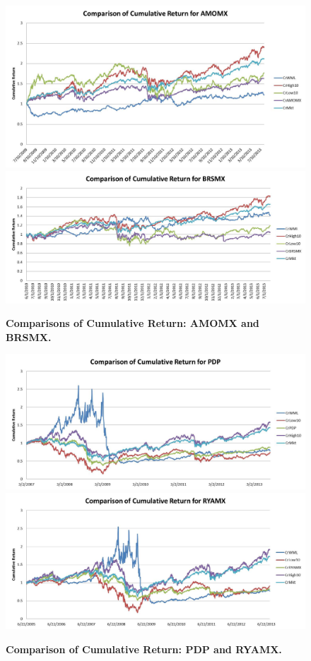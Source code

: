 \documentclass[12pt]{article}
\begin{document}
\begin{figure}[p]
\centering
\caption{\textbf{Comparisons of Cumulative Return: AMOMX and BRSMX.}}
\includegraphics[scale=0.6]{CompAMOMX.jpg}
\includegraphics[scale=0.6]{CompBRSMX.jpg}
\end{figure}

\begin{figure}[p]
\centering
\caption{\textbf{Comparison of Cumulative Return: PDP and RYAMX.}}
\includegraphics[scale=0.6]{CompPDP.jpg}
\includegraphics[scale=0.6]{CompRYAMX.jpg}
\end{figure}
\end{document}
